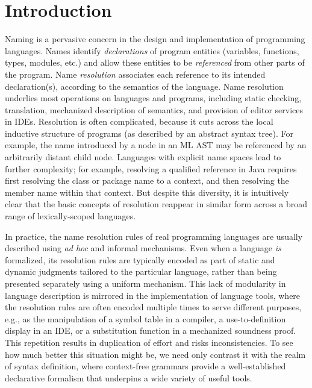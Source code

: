 \section{Introduction}

Naming is a pervasive concern in the design and implementation of
programming languages. Names identify \emph{declarations} of program
entities (variables, functions, types, modules, etc.) and allow these
entities to be \emph{referenced} from other parts of the program. Name
\emph{resolution} associates each reference to its intended
declaration(s), according to the semantics of the language. Name
resolution underlies most operations on languages and programs,
including static checking, translation, mechanized description of
semantics, and provision of editor services in IDEs. Resolution is often
complicated, because it cuts across the local inductive structure of
programs (as described by an abstract syntax tree). For example, the
name introduced by a  node in an ML AST may be referenced by an
arbitrarily distant child node. Languages with explicit name spaces
lead to further complexity; for example, resolving a qualified
reference in Java requires first resolving the class or package name to
a context, and then resolving the member name within that context. 
But despite this diversity, 
it is intuitively clear that the basic concepts of resolution reappear in
similar form across a broad range of lexically-scoped languages.

In practice, the name resolution rules of real programming
languages are usually described using {\it ad hoc} and informal
mechanisms. Even when a language \emph{is} formalized, its resolution
rules are typically encoded as part of static and dynamic judgments
tailored to the particular language, rather than being presented
separately using a uniform mechanism. This lack of modularity in
language description is mirrored in the implementation of language
tools, where the resolution rules are often encoded multiple times to
serve different purposes, e.g., as the manipulation of a symbol table in
a compiler, a use-to-definition display in an IDE, or a substitution
function in a mechanized soundness proof. This repetition results in
duplication of effort and risks inconsistencies. To see how much better
this situation might be, we need only contrast it with 
the realm of syntax definition, where context-free grammars provide 
a well-established declarative formalism that underpins a 
wide variety of useful tools. 


